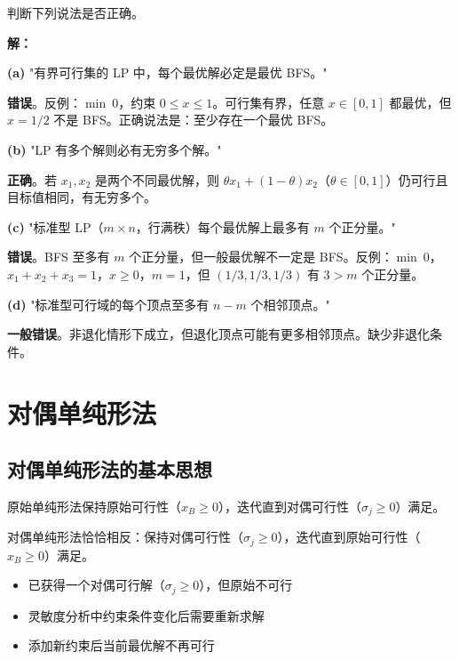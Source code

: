 \begin{example}[线性规划基本概念判断]\label{ex:lp-true-false}
判断下列说法是否正确。

\textbf{解：}

\textbf{(a)} "有界可行集的 LP 中，每个最优解必定是最优 BFS。"

\textbf{错误}。反例：$\min\ 0$，约束 $0 \leq x \leq 1$。可行集有界，任意 $x \in [0, 1]$ 都最优，但 $x = 1/2$ 不是 BFS。正确说法是：至少存在一个最优 BFS。

\textbf{(b)} "LP 有多个解则必有无穷多个解。"

\textbf{正确}。若 $x_1, x_2$ 是两个不同最优解，则 $\theta x_1 + (1-\theta)x_2$（$\theta \in [0,1]$）仍可行且目标值相同，有无穷多个。

\textbf{(c)} "标准型 LP（$m \times n$，行满秩）每个最优解上最多有 $m$ 个正分量。"

\textbf{错误}。BFS 至多有 $m$ 个正分量，但一般最优解不一定是 BFS。反例：$\min\ 0$，$x_1 + x_2 + x_3 = 1$，$x \geq 0$，$m = 1$，但 $(1/3, 1/3, 1/3)$ 有 $3 > m$ 个正分量。

\textbf{(d)} "标准型可行域的每个顶点至多有 $n - m$ 个相邻顶点。"

\textbf{一般错误}。非退化情形下成立，但退化顶点可能有更多相邻顶点。缺少非退化条件。
\end{example}

\section{对偶单纯形法}\label{sec:dual-simplex}

\subsection{对偶单纯形法的基本思想}

原始单纯形法保持原始可行性（$x_B \geq 0$），迭代直到对偶可行性（$\sigma_j \geq 0$）满足。

对偶单纯形法恰恰相反：保持对偶可行性（$\sigma_j \geq 0$），迭代直到原始可行性（$x_B \geq 0$）满足。

\begin{conceptbox}[对偶单纯形法的适用场景]
\begin{itemize}
    \item 已获得一个对偶可行解（$\sigma_j \geq 0$），但原始不可行
    \item 灵敏度分析中约束条件变化后需要重新求解
    \item 添加新约束后当前最优解不再可行
\end{itemize}
\end{conceptbox}

